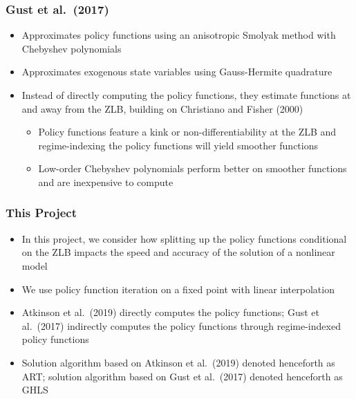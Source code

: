 \documentclass[11pt]{beamer}
\begin{document}
\begin{frame}\frametitle{Gust et al.\ (2017)}
\begin{itemize}\setlength{\itemsep}{6pt}
\item  <1-|handout:1>Approximates policy functions using an anisotropic Smolyak method with Chebyshev polynomials
\item  <2-|handout:1>Approximates exogenous state variables using Gauss-Hermite quadrature%
\item  <3-|handout:1>Instead of directly computing the policy functions, they estimate functions at and away from the ZLB, building on Christiano and Fisher (2000)
  \begin{itemize}\setlength{\itemsep}{4pt}
\item  Policy functions feature a kink or non-differentiability at the ZLB and regime-indexing the policy functions will yield smoother functions
\item Low-order Chebyshev polynomials perform better on smoother functions and are inexpensive to compute
\end{itemize}
\end{itemize}
\end{frame}
\begin{frame}\frametitle{This Project}
\begin{itemize}\setlength{\itemsep}{8pt}
\item  <1-|handout:1>In this project, we consider how splitting up the policy functions conditional on the ZLB impacts the speed and accuracy of the solution of a nonlinear model
\item  <2-|handout:1>We use policy function iteration on a fixed point with linear interpolation
\item  <3-|handout:1>Atkinson et al.\ (2019) directly computes the policy functions;  Gust et al.\ (2017) indirectly computes the policy functions through regime-indexed policy functions
\item <4-|handout:1> Solution algorithm based on Atkinson et al.\ (2019) denoted henceforth as ART; solution algorithm based on Gust et al.\ (2017) denoted henceforth as GHLS
\end{itemize}
\end{frame}
\end{document}
